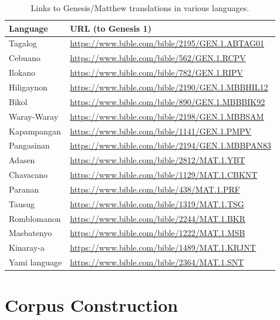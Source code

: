 \documentclass{article}
\begin{document}
\begin{table}[h!]
    \centering
    \begin{tabular}{ll}
        \hline
        \textbf{Language} & \textbf{URL (to Genesis 1)}                           \\
        \hline
        Tagalog           & \url{https://www.bible.com/bible/2195/GEN.1.ABTAG01}  \\
        Cebuano           & \url{https://www.bible.com/bible/562/GEN.1.RCPV}      \\
        Ilokano           & \url{https://www.bible.com/bible/782/GEN.1.RIPV}      \\
        Hiligaynon        & \url{https://www.bible.com/bible/2190/GEN.1.MBBHIL12} \\
        Bikol             & \url{https://www.bible.com/bible/890/GEN.1.MBBBIK92}  \\
        Waray-Waray       & \url{https://www.bible.com/bible/2198/GEN.1.MBBSAM}   \\
        Kapampangan       & \url{https://www.bible.com/bible/1141/GEN.1.PMPV}     \\
        Pangasinan        & \url{https://www.bible.com/bible/2194/GEN.1.MBBPAN83} \\
        Adasen            & \url{https://www.bible.com/bible/2812/MAT.1.YBT}      \\
        Chavacano         & \url{https://www.bible.com/bible/1129/MAT.1.CBKNT}    \\
        Paranan           & \url{https://www.bible.com/bible/438/MAT.1.PRF}       \\
        Tausug            & \url{https://www.bible.com/bible/1319/MAT.1.TSG}      \\
        Romblomanon       & \url{https://www.bible.com/bible/2244/MAT.1.BKR}      \\
        Masbatenyo        & \url{https://www.bible.com/bible/1222/MAT.1.MSB}      \\
        Kinaray-a         & \url{https://www.bible.com/bible/1489/MAT.1.KRJNT}    \\
        Yami language     & \url{https://www.bible.com/bible/2364/MAT.1.SNT}      \\
        \hline
    \end{tabular}
    \caption{Links to Genesis/Matthew translations in various languages.}
\end{table}

\section{Corpus Construction}
\end{document}
